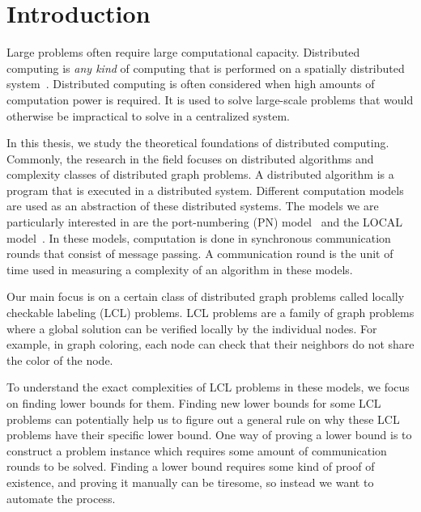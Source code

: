 
\section{Introduction}  \label{sec:introduction}


\thispagestyle{empty}

Large problems often require large computational capacity.
Distributed computing is \emph{any kind} of computing that is performed on a spatially distributed system~\cite{DBLP:books/el/leeuwen90/LamportL90}.
Distributed computing is often considered when high amounts of computation power is required.
It is used to solve large-scale problems that would otherwise be impractical to solve in a centralized system.

In this thesis, we study the theoretical foundations of distributed computing.
Commonly, the research in the field focuses on distributed algorithms and complexity classes of distributed graph problems.
A distributed algorithm is a program that is executed in a distributed system.
Different computation models are used as an abstraction of these distributed systems.
The models we are particularly interested in are the port-numbering (PN) model~\cite{DBLP:conf/stoc/Angluin80} and the LOCAL model~\cite{DBLP:conf/focs/Linial87}.
In these models, computation is done in synchronous communication rounds that consist of message passing.
A communication round is the unit of time used in measuring a complexity of an algorithm in these models.

Our main focus is on a certain class of distributed graph problems called locally checkable labeling (LCL) problems.
LCL problems are a family of graph problems where a global solution can be verified locally by the individual nodes.
For example, in graph coloring, each node can check that their neighbors do not share the color of the node.


To understand the exact complexities of LCL problems in these models, we focus on finding lower bounds for them.
Finding new lower bounds for some LCL problems can potentially help us to figure out a general rule on why these LCL problems have their specific lower bound.
One way of proving a lower bound is to construct a problem instance which requires some amount of communication rounds to be solved.
Finding a lower bound requires some kind of proof of existence, and proving it manually can be tiresome, so instead we want to automate the process.

